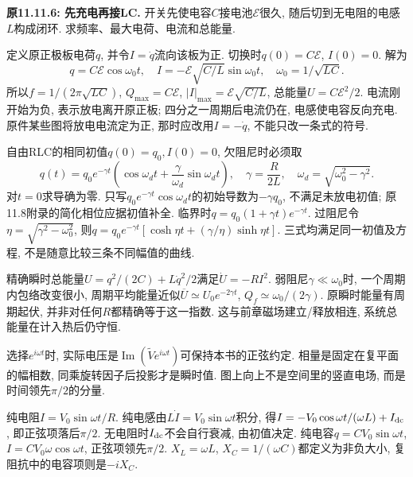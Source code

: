 \label{tb:rlc-initial}
\begin{example}
\textbf{原11.11.6: 先充电再接LC.} 开关先使电容$C$接电池$\mathcal E$很久, 随后切到无电阻的电感$L$构成闭环. 求频率、最大电荷、电流和总能量.
\end{example}
\begin{solution}
定义原正极板电荷$q$, 并令$I=\dot q$流向该板为正. 切换时$q(0)=C\mathcal E$, $I(0)=0$. 解为
\[q=C\mathcal E\cos\omega_0t,\quad I=-\mathcal E\sqrt{C/L}\sin\omega_0t,
\quad \omega_0=1/\sqrt{LC}.\]
所以$f=1/(2\pi\sqrt{LC})$, $Q_{\max}=C\mathcal E$, $|I|_{\max}=\mathcal E\sqrt{C/L}$, 总能量$U=C\mathcal E^2/2$. 电流刚开始为负, 表示放电离开原正板; 四分之一周期后电流仍在, 电感使电容反向充电. 原件某些图将放电电流定为正, 那时应改用$I=-\dot q$, 不能只改一条式的符号.
\end{solution}

自由RLC的相同初值$q(0)=q_0,I(0)=0$, 欠阻尼时必须取
\[q(t)=q_0e^{-\gamma t}\left(\cos\omega_dt+\frac\gamma{\omega_d}\sin\omega_dt\right),\quad
\gamma=\frac R{2L},\quad\omega_d=\sqrt{\omega_0^2-\gamma^2}.\]
对$t=0$求导确为零. 只写$q_0e^{-\gamma t}\cos\omega_dt$的初始导数为$-\gamma q_0$, 不满足未放电初值; 原11.8附录的简化相位应据初值补全. 临界时$q=q_0(1+\gamma t)e^{-\gamma t}$. 过阻尼令$\eta=\sqrt{\gamma^2-\omega_0^2}$, 则$q=q_0e^{-\gamma t}[\cosh\eta t+(\gamma/\eta)\sinh\eta t]$. 三式均满足同一初值及方程, 不是随意比较三条不同幅值的曲线.

精确瞬时总能量$U=q^2/(2C)+L\dot q^2/2$满足$\dot U=-RI^2$. 弱阻尼$\gamma\ll\omega_0$时, 一个周期内包络改变很小, 周期平均能量近似$\overline U\simeq U_0e^{-2\gamma t}$, $Q_f\simeq\omega_0/(2\gamma)$. 原瞬时能量有周期起伏, 并非对任何$R$都精确等于这一指数. 这与前章磁场建立/释放相连, 系统总能量在计入热后仍守恒.

\label{tb:phasor-diagrams}
选择$e^{i\omega t}$时, 实际电压是$\operatorname{Im}(\widetilde V e^{i\omega t})$可保持本书的正弦约定. 相量是固定在复平面的幅相数, 同乘旋转因子后投影才是瞬时值. 图上向上不是空间里的竖直电场, 而是时间领先$\pi/2$的分量.

纯电阻$I=V_0\sin\omega t/R$. 纯电感由$L\dot I=V_0\sin\omega t$积分, 得$I=-V_0\cos\omega t/(\omega L)+I_{\rm dc}$, 即正弦项落后$\pi/2$. 无电阻时$I_{\rm dc}$不会自行衰减, 由初值决定. 纯电容$q=CV_0\sin\omega t$, $I=CV_0\omega\cos\omega t$, 正弦项领先$\pi/2$. $X_L=\omega L$, $X_C=1/(\omega C)$都定义为非负大小, 复阻抗中的电容项则是$-iX_C$.

